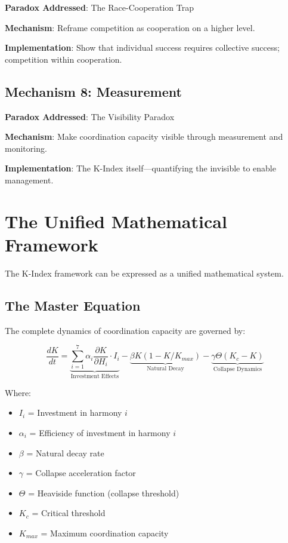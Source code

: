 \documentclass[12pt,letterpaper]{article}
\begin{document}
\textbf{Paradox Addressed}: The Race-Cooperation Trap

\textbf{Mechanism}: Reframe competition as cooperation on a higher level.

\textbf{Implementation}: Show that individual success requires collective success; competition within cooperation.

\subsection{Mechanism 8: Measurement}

\textbf{Paradox Addressed}: The Visibility Paradox

\textbf{Mechanism}: Make coordination capacity visible through measurement and monitoring.

\textbf{Implementation}: The K-Index itself---quantifying the invisible to enable management.

\section{The Unified Mathematical Framework}

The K-Index framework can be expressed as a unified mathematical system.

\subsection{The Master Equation}

The complete dynamics of coordination capacity are governed by:

\begin{equation}
\frac{dK}{dt} = \underbrace{\sum_{i=1}^{7} \alpha_i \frac{\partial K}{\partial H_i} \cdot I_i}_{\text{Investment Effects}} - \underbrace{\beta K (1 - K/K_{max})}_{\text{Natural Decay}} - \underbrace{\gamma \Theta(K_c - K)}_{\text{Collapse Dynamics}}
\end{equation}

Where:
\begin{itemize}
    \item $I_i$ = Investment in harmony $i$
    \item $\alpha_i$ = Efficiency of investment in harmony $i$
    \item $\beta$ = Natural decay rate
    \item $\gamma$ = Collapse acceleration factor
    \item $\Theta$ = Heaviside function (collapse threshold)
    \item $K_c$ = Critical threshold
    \item $K_{max}$ = Maximum coordination capacity
\end{itemize}
\end{document}
